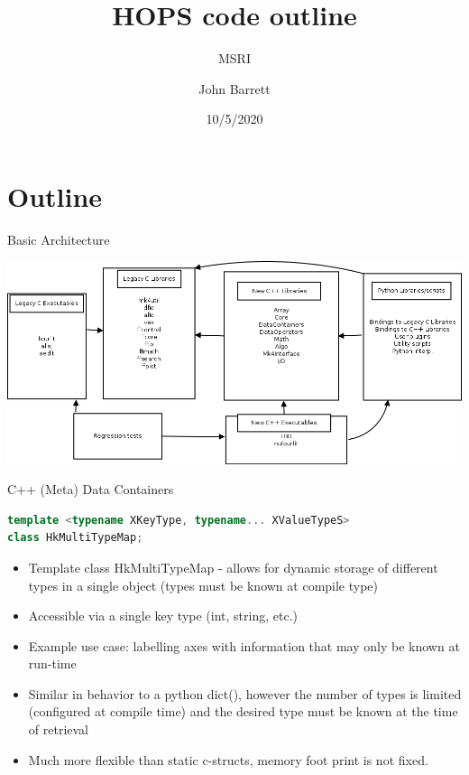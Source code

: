 \documentclass[xcolor=svgnames]{beamer}
\title[MSRI HOPS]{HOPS code outline}
\subtitle[]{MSRI}
\author[J. Barrett ]{John Barrett}
\institute[MIT]{Massachusetts Institute of Technology}
\date[10/5/2020]{10/5/2020}
\begin{document}
\section{Outline}

\begin{frame}{Basic Architecture}

\begin{center}
      \includegraphics[width=\textwidth]{arch_overview.png}\\
\end{center}

\end{frame}

\begin{frame}[fragile]{C++ (Meta) Data Containers}

\begin{lstlisting}[language=C++,basicstyle=\ttfamily\tiny,keywordstyle=\color{red}]
template <typename XKeyType, typename... XValueTypeS>
class HkMultiTypeMap;
\end{lstlisting}

\begin{itemize}
\item Template class HkMultiTypeMap - allows for dynamic storage of different types in a single object (types must be known at compile type)
\item Accessible via a single key type (int, string, etc.)
\item Example use case: labelling axes with information that may only be known at run-time
\item Similar in behavior to a python dict(), however the number of types is limited (configured at compile time) and the desired type
must be known at the time of retrieval
\item Much more flexible than static c-structs, memory foot print is not fixed.
\end{itemize}
 
\end{frame}
\end{document}
